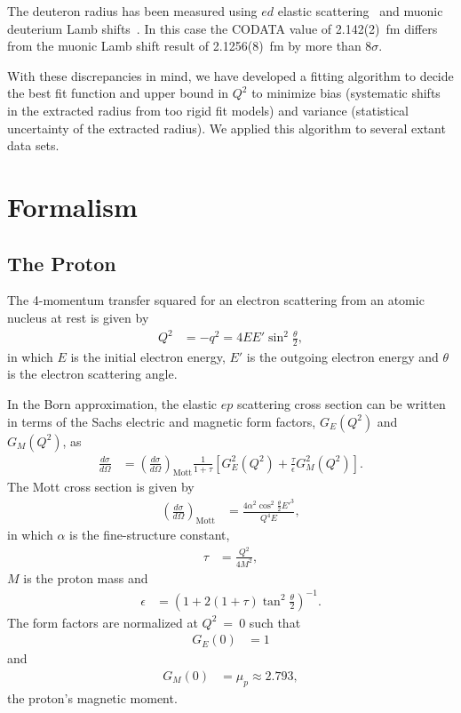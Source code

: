 \documentclass[aps,prd,twocolumn,groupedaddress,10pt]{revtex4-1}
\begin{document}
The deuteron radius has been measured using $ed$ elastic scattering~\cite{Simon1980,Platchkov1990} and muonic deuterium Lamb shifts~\cite{Pohl:2016glp}. In this case the CODATA value of 2.142(2)~fm differs from the muonic Lamb shift result of 2.1256(8)~fm by more than 8$\sigma$.

With these discrepancies in mind, we have developed a fitting algorithm to decide the best fit function and upper bound in $Q^2$ to minimize bias (systematic shifts in the extracted radius from too rigid fit models) and variance (statistical uncertainty of the extracted radius). We applied this algorithm to several extant data sets. 

\section{Formalism}
\subsection{The Proton}

The 4-momentum transfer squared for an electron scattering from an atomic nucleus at rest is given by
\begin{align}
Q^2 &= -q^2 = 4EE'\sin^2\frac{\theta}{2},
\end{align}
in which $E$ is the initial electron energy, $E'$ is the outgoing electron energy and $\theta$ is the electron scattering angle. 

In the Born approximation, the elastic $ep$ scattering cross section can be written in terms of the Sachs electric and magnetic form factors, $G_E(Q^2)$ and $G_M(Q^2)$, as
\begin{align}
\frac{d\sigma}{d\Omega} &= \left( \frac{d\sigma}{d\Omega} \right)_{\text{Mott}}\frac{1}{1+\tau} \left[ G_E^2(Q^2) + \frac{\tau}{\epsilon} G_M^2(Q^2)\right].
\end{align}
The Mott cross section is given by
\begin{align}
 \left( \frac{d\sigma}{d\Omega} \right)_{\text{Mott}} &= \frac{4 \alpha^2 \cos^2\frac{\theta}{2} {E'}^3}{Q^4 E},
\end{align}
in which $\alpha$ is the fine-structure constant,
\begin{align}
\tau &= \frac{Q^2}{4M^2},
\end{align}
$M$ is the proton mass and
\begin{align}
\epsilon &= \left( 1+2(1+\tau)\tan^2 \frac{\theta}{2}\right)^{-1}.
\end{align}
The form factors are normalized at $Q^2~=~0$ such that
\begin{align}
G_E(0)&=1
\end{align}
and
\begin{align}
G_M(0) &= \mu_p \approx 2.793,
\end{align}
the proton's magnetic moment.
\end{document}
